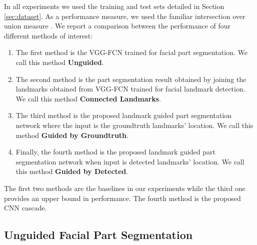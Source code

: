 In all experiments we used the training and test sets detailed in
Section \ref{sec:dataset}. As a performance measure, we used the
familiar intersection over union measure \cite{long2015fully}. We
report a comparison between the performance of four different methods
of interest:
\begin{enumerate}
\item The first method is the VGG-FCN trained for facial part
  segmentation. We call this method \textbf{Unguided}.
\item The second method is the part segmentation result obtained by
  joining the landmarks obtained from VGG-FCN trained for facial
  landmark detection. We call this method \textbf{Connected
    Landmarks}.
\item The third method is the proposed landmark guided part
  segmentation network where the input is the groundtruth landmarks'
  location. We call this method \textbf{Guided by Groundtruth}.
\item Finally, the fourth method is the proposed landmark guided part
  segmentation network when input is detected landmarks' location. We
  call this method \textbf{Guided by Detected}.
\end{enumerate}
The first two methods are the baselines in our experiments while the
third one provides an upper bound in performance. The fourth method is
the proposed CNN cascade.



\subsection{Unguided Facial Part Segmentation}

